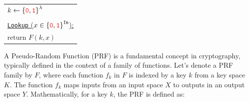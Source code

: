 \documentclass[12pt,openany]{book}
\renewcommand{\arraystretch}{1.25}
\theoremstyle{definition}
\newcommand{\zero}{\textcolor{red}{\texttt{0}}}
\newcommand{\one}{\textcolor{red}{\texttt{1}}}
\newcommand{\tab}{\hspace{12pt}}
\newcommand{\binaryfield}{\set{\zero,\one}}
\newcommand{\indexbit}{\texttt{In}}
\newcommand{\outbit}{\texttt{Out}}
\begin{document}
\begin{center}
	\begin{minipage}{.25\textwidth}\centering
		{\renewcommand{\arraystretch}{1.25}\begin{tabular}{|l|}
				\hline
				$k\gets\binaryfield^\lambda$\\
				\\
				\underline{\texttt{Lookup} ($x\in\binaryfield^{\indexbit}$):}\\
				\tab return $F(k,x)$\\
				\hline
		\end{tabular}}
	\end{minipage}
	\begin{minipage}{.7\textwidth}
		\begin{flushright}
		\end{flushright}
	\end{minipage}
\end{center}

A Pseudo-Random Function (PRF) is a fundamental concept in cryptography, typically defined in the context of a family of functions. Let's denote a PRF family by \( F \), where each function \( f_k \) in \( F \) is indexed by a key \( k \) from a key space \( K \). The function \( f_k \) maps inputs from an input space \( X \) to outputs in an output space \( Y \). Mathematically, for a key \( k \), the PRF is defined as:
\end{document}
